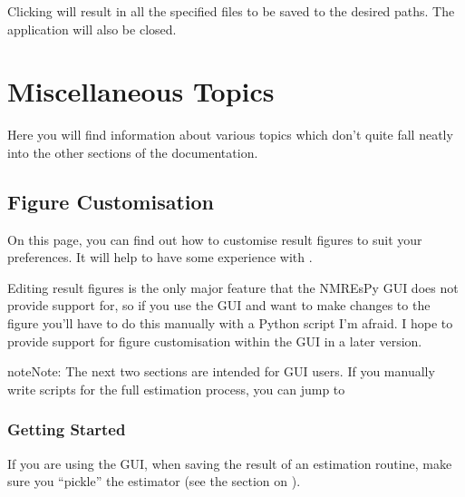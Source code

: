 \documentclass[letterpaper,10pt,english]{sphinxmanual}
\begin{document}
\sphinxAtStartPar
Clicking  will result in all the specified files to be saved to the desired
paths. The application will also be closed.




\chapter{Miscellaneous Topics}
\label{\detokenize{misc/index:miscellaneous-topics}}\label{\detokenize{misc/index::doc}}
\sphinxAtStartPar
Here you will find information about various topics which don’t quite fall
neatly into the other sections of the documentation.




\section{Figure Customisation}
\label{\detokenize{misc/figure_customisation:figure-customisation}}\label{\detokenize{misc/figure_customisation::doc}}
\sphinxAtStartPar
On this page, you can find out how to customise result figures to suit your
preferences. It will help to have some experience with
.

\sphinxAtStartPar
Editing result figures is the only major feature that the NMR\sphinxhyphen{}EsPy GUI does
not provide support for, so if you use the GUI and want to make changes to the
figure you’ll have to do this manually with a Python script I’m afraid. I hope
to provide support for figure customisation within the GUI in a later version.

\begin{sphinxadmonition}{note}{Note:}
\sphinxAtStartPar
The next two sections are intended for GUI users. If you manually write
scripts for the full estimation process, you can jump to
{\hyperref[\detokenize{misc/figure_customisation:generate-the-estimation-figure}]{}}
\end{sphinxadmonition}


\subsection{Getting Started}
\label{\detokenize{misc/figure_customisation:getting-started}}
\sphinxAtStartPar
If you are using the GUI, when saving the result of an estimation routine, make
sure you “pickle” the estimator (see the section  on
{\hyperref[\detokenize{gui/usage/result::doc}]{}}).
\end{document}
